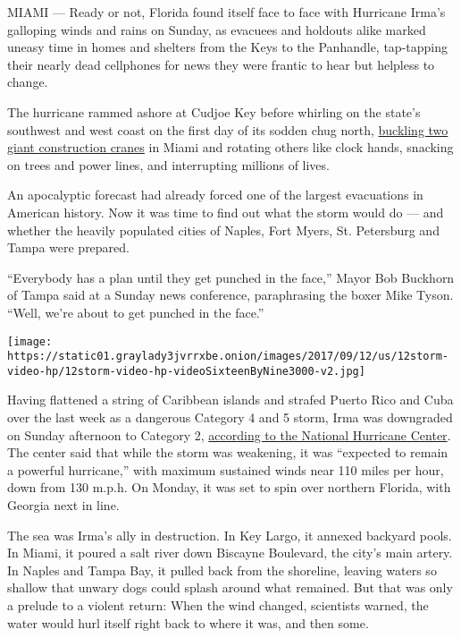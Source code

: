 MIAMI --- Ready or not, Florida found itself face to face with Hurricane
Irma's galloping winds and rains on Sunday, as evacuees and holdouts
alike marked uneasy time in homes and shelters from the Keys to the
Panhandle, tap-tapping their nearly dead cellphones for news they were
frantic to hear but helpless to change.

The hurricane rammed ashore at Cudjoe Key before whirling on the state's
southwest and west coast on the first day of its sodden chug north,
\href{https://www.nytimes3xbfgragh.onion/2017/09/10/us/crane-collapse-miami-irma.html?smid=tw-nytnational\&smtyp=cur\&_r=0}{buckling
two giant construction cranes} in Miami and rotating others like clock
hands, snacking on trees and power lines, and interrupting millions of
lives.

An apocalyptic forecast had already forced one of the largest
evacuations in American history. Now it was time to find out what the
storm would do --- and whether the heavily populated cities of Naples,
Fort Myers, St. Petersburg and Tampa were prepared.

``Everybody has a plan until they get punched in the face,'' Mayor Bob
Buckhorn of Tampa said at a Sunday news conference, paraphrasing the
boxer Mike Tyson. ``Well, we're about to get punched in the face.''

\texttt{[image: https://static01.graylady3jvrrxbe.onion/images/2017/09/12/us/12storm-video-hp/12storm-video-hp-videoSixteenByNine3000-v2.jpg]}

Having flattened a string of Caribbean islands and strafed Puerto Rico
and Cuba over the last week as a dangerous Category 4 and 5 storm, Irma
was downgraded on Sunday afternoon to Category 2,
\href{http://www.nhc.noaa.gov/text/refresh/MIATCPAT1+shtml/101757.shtml}{according
to the National Hurricane Center}. The center said that while the storm
was weakening, it was ``expected to remain a powerful hurricane,'' with
maximum sustained winds near 110 miles per hour, down from 130 m.p.h. On
Monday, it was set to spin over northern Florida, with Georgia next in
line.

The sea was Irma's ally in destruction. In Key Largo, it annexed
backyard pools. In Miami, it poured a salt river down Biscayne
Boulevard, the city's main artery. In Naples and Tampa Bay, it pulled
back from the shoreline, leaving waters so shallow that unwary dogs
could splash around what remained. But that was only a prelude to a
violent return: When the wind changed, scientists warned, the water
would hurl itself right back to where it was, and then some.

